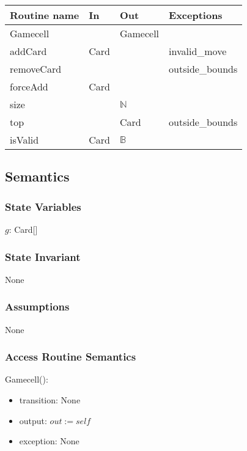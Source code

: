 \documentclass[12pt]{article}
\begin{document}
\begin{tabular}{| l | l | l | l |}
	\hline
	\textbf{Routine name} & \textbf{In} & \textbf{Out} & \textbf{Exceptions}\\
	\hline
	Gamecell & ~ & Gamecell & \\
	\hline
	addCard & Card & ~ & invalid\_move\\
	\hline
	removeCard & ~ & ~ & outside\_bounds\\
	\hline
	forceAdd & Card & ~ & ~\\
	\hline
	size & ~ & $\mathbb{N}$ & ~\\
	\hline
	top & ~ & Card & outside\_bounds\\
	\hline
	isValid & Card & $\mathbb{B}$ & ~\\
	\hline
	
\end{tabular}

\subsection* {Semantics}

\subsubsection* {State Variables}

$g$: Card[]\\

\subsubsection* {State Invariant}

None

\subsubsection* {Assumptions}

None

\subsubsection* {Access Routine Semantics}

Gamecell():
\begin{itemize}
	\item transition: None
	\item output: $out := \mathit{self}$
	\item exception: None
\end{itemize}
\end{document}
